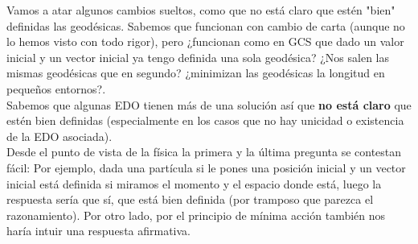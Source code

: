 \documentclass[palatino, bibnumbers]{apuntes}
\begin{document}
Vamos a atar algunos cambios sueltos, como que no está claro que estén "bien" definidas las geodésicas. Sabemos que funcionan con cambio de carta (aunque no lo hemos visto con todo rigor), pero ¿funcionan como en GCS que dado un valor inicial y un vector inicial ya tengo definida una sola geodésica? ¿Nos salen las mismas geodésicas que en segundo? ¿minimizan las geodésicas la longitud en pequeños entornos?.\\ \indent Sabemos que algunas EDO tienen más de una solución así que \textbf{no está claro} que estén bien definidas (especialmente en los casos que no hay unicidad o existencia de la EDO asociada). \\ \indent Desde el punto de vista de la física la primera y la última pregunta se contestan fácil: Por ejemplo, dada una partícula si le pones una posición inicial y un vector inicial está definida si miramos el momento y el espacio donde está, luego la respuesta sería que sí, que está bien definida (por tramposo que parezca el razonamiento). Por otro lado, por el principio de mínima acción también nos haría intuir una respuesta afirmativa.\\
\end{document}
